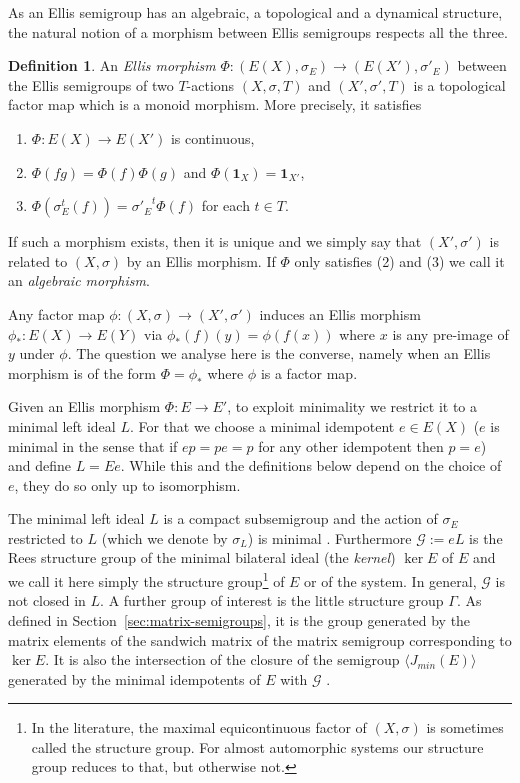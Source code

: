 \documentclass[12pt]{amsart}
\theoremstyle{definition}
\newtheorem{definition}[theorem]{Definition}
\numberwithin{equation}{section}
\newcommand{\Gg}{{\mathcal G}}
\newcommand{\id}{{\mathbf 1}}
\begin{document}
As an Ellis semigroup has an algebraic, a topological and a dynamical structure, the natural notion of a morphism between Ellis semigroups respects all the three.



\begin{definition}
An {\em Ellis  morphism} $\Phi: (E(X), \sigma_E)\rightarrow( E(X'), \sigma'_E)$ between the Ellis semigroups of two $T$-actions $(X,\sigma,T)$ and $(X',\sigma',T)$ is a topological  factor map which is a monoid morphism. More precisely, it satisfies \begin{enumerate}
\item $\Phi: E(X)\rightarrow E(X')$ is continuous,
\item $\Phi(fg) = \Phi(f) \Phi(g)$ and $\Phi (\id_X)= \id_{X'}$, 
\item
$\Phi(\sigma_E^{t}(f))= {\sigma'_E}^{t}\Phi(f)$ for each $t\in T$.
\end{enumerate}
 \end{definition}
If  such a morphism exists, then it is unique and we simply say that $(X',\sigma')$ is  related to $(X,\sigma)$ by an Ellis morphism. 
If $\Phi$  only satisfies (2) and (3) we call it an {\em algebraic morphism}. 

Any factor map  $\phi:(X, \sigma)\to (X',\sigma')$ induces an Ellis  morphism  
$\phi_*: E(X) \to E(Y)$ via $\phi_*(f)(y) = \phi(f(x))$ where $x$ is any pre-image of $y$ under $\phi$. The question we analyse here is the converse, namely when  an Ellis morphism is of the form $\Phi=\phi_*$ where $\phi$ is a factor map.
 

Given an Ellis morphism $\Phi:E\to E'$, 
to exploit minimality we restrict it to a minimal left ideal $L$. For that we
choose a minimal idempotent $e\in E(X)$ ($e$ is minimal in the sense that if $ep=pe=p$ for any other idempotent then $p=e$) and define $L=Ee$. 
While this and the definitions below depend on the choice of $e$, they do so only up to isomorphism. 

The minimal left ideal $L$ is a  compact subsemigroup and the action of $\sigma_E$ restricted to $L$ (which we denote by $\sigma_L$) is minimal \cite{Auslander1988}. 
Furthermore $\Gg := eL$ is the Rees structure group of the minimal bilateral ideal (the {\em kernel}) $\ker E$ of $E$ and we call it here simply the structure group\footnote{In the literature, the maximal equicontinuous factor of $(X,\sigma)$ is sometimes called the structure group. For almost automorphic systems our structure group reduces to that, but otherwise not.} 
 of $E$ or of the system. In general, $\Gg$ is not closed in $L$. A further group of interest is the little structure group $\Gamma$. As defined in Section~\ref{sec:matrix-semigroups},  it is the group generated by the matrix elements of the sandwich matrix of the matrix semigroup corresponding to  $\ker E$. It is also the intersection of the closure of the semigroup  $\langle J_{min}(E)\rangle $ generated by the minimal idempotents of $E$ with $\Gg$ \cite{ESBS}.
\end{document}
